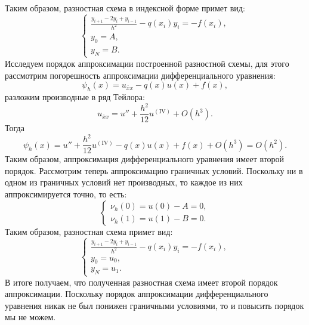 \documentclass[11pt]{article}
\begin{document}
Таким образом, разностная схема в индексной форме примет вид:
$$\begin{cases}
    \frac{y_{i+1}-2y_i+y_{i-1}}{h^2}-q(x_i)y_i=-f(x_i),\\
    y_0=A,\\
    y_N=B.
\end{cases}$$
Исследуем порядок аппроксимации построенной разностной схемы, для этого рассмотрим погорешность аппроксимации дифференциального уравнения:
$$\psi_h(x)=u_{\overline{x}x}-q(x)u(x)+f(x),$$
разложим производные в ряд Тейлора:
$$u_{\overline{x}x}=u''+\frac{h^2}{12}u^{(\text{IV})}+O(h^3).$$
Тогда
$$\psi_h(x)=u''+\frac{h^2}{12}u^{(\text{IV})}-q(x)u(x)+f(x)+O(h^3)=O(h^2).$$
Таким образом, аппроксимация дифференциального уравнения имеет второй порядок.
Рассмотрим теперь аппроксимацию граничных условий. Поскольку ни в одном из граничных условий нет производных, то каждое из них аппроксимируется точно, то есть:
$$\begin{cases}
    \nu_h(0)=u(0)-A=0,\\
    \nu_h(1)=u(1)-B=0.
\end{cases}$$
Таким образом, разностная схема примет вид:
$$\begin{cases}
    \frac{y_{i+1}-2y_i+y_{i-1}}{h^2}-q(x_i)y_i=-f(x_i),\\
    y_0=u_0,\\
    y_N=u_1.
\end{cases}$$
В итоге получаем, что полученная разностная схема имеет второй порядок аппроксимации. Поскольку порядок аппроксимации дифференциального уравнения никак не был понижен граничными условиями, то и повысить порядок мы не можем.
\end{document}
